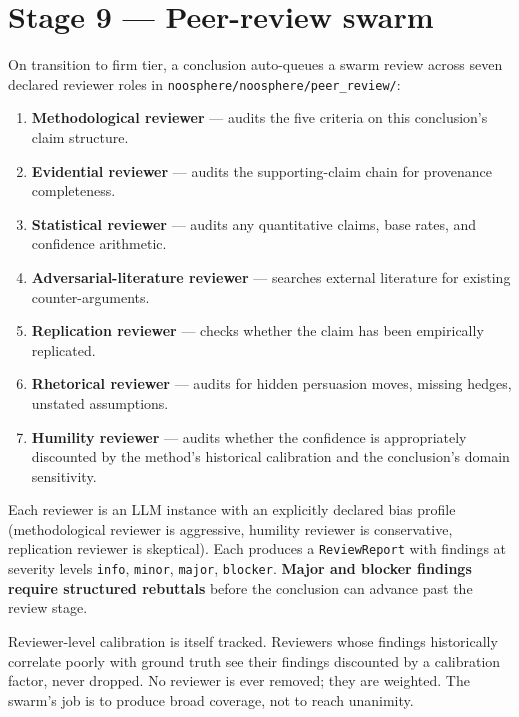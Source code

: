 \documentclass[11pt,letterpaper]{article}
\newcommand{\file}[1]{\texttt{#1}}
\begin{document}
\section{Stage 9 --- Peer-review swarm}

On transition to firm tier, a conclusion auto-queues a swarm review across seven declared reviewer roles in \file{noosphere/noosphere/peer\_review/}:

\begin{enumerate}[leftmargin=1.5em,itemsep=0.1em]
\item \textbf{Methodological reviewer} --- audits the five criteria on this conclusion's claim structure.
\item \textbf{Evidential reviewer} --- audits the supporting-claim chain for provenance completeness.
\item \textbf{Statistical reviewer} --- audits any quantitative claims, base rates, and confidence arithmetic.
\item \textbf{Adversarial-literature reviewer} --- searches external literature for existing counter-arguments.
\item \textbf{Replication reviewer} --- checks whether the claim has been empirically replicated.
\item \textbf{Rhetorical reviewer} --- audits for hidden persuasion moves, missing hedges, unstated assumptions.
\item \textbf{Humility reviewer} --- audits whether the confidence is appropriately discounted by the method's historical calibration and the conclusion's domain sensitivity.
\end{enumerate}

Each reviewer is an LLM instance with an explicitly declared bias profile (methodological reviewer is aggressive, humility reviewer is conservative, replication reviewer is skeptical). Each produces a \texttt{ReviewReport} with findings at severity levels \texttt{info}, \texttt{minor}, \texttt{major}, \texttt{blocker}. \textbf{Major and blocker findings require structured rebuttals} before the conclusion can advance past the review stage.

Reviewer-level calibration is itself tracked. Reviewers whose findings historically correlate poorly with ground truth see their findings discounted by a calibration factor, never dropped. No reviewer is ever removed; they are weighted. The swarm's job is to produce broad coverage, not to reach unanimity.
\end{document}
